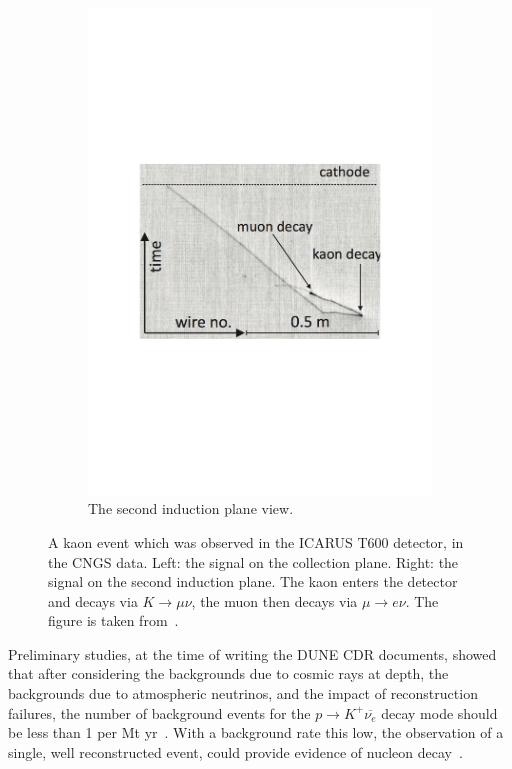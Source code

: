 \begin{figure}
\begin{subfigure}{0.42\textwidth}
    \includegraphics[width=\textwidth]{ICARUSKaon_Ind}
    \caption{The second induction plane view.}
  \end{subfigure}
  \caption[A kaon event which was observed in the ICARUS T600 detector, in the CNGS data]
          {A kaon event which was observed in the ICARUS T600 detector, in the CNGS data. Left: the signal on the collection plane. Right: the signal on the second induction plane. The kaon enters the detector and decays via $K \rightarrow \mu \nu$, the muon then decays via $\mu \rightarrow e \nu$. The figure is taken from~\citep{PMTrack}.}
  \label{fig:ICARUSKaon}
\end{figure}

Preliminary studies, at the time of writing the DUNE CDR documents, showed that after considering the backgrounds due to cosmic rays at depth, the backgrounds due to atmospheric neutrinos, and the impact of reconstruction failures, the number of background events for the $p \rightarrow K^{+} \overline{\nu_{e}}$ decay mode should be less than 1 per Mt yr~\citep{Klinger:2015kva, Adams:2013qkq, LBNE8836}. With a background rate this low, the observation of a single, well reconstructed event, could provide evidence of nucleon decay~\citep{DUNECDR_V2}. 

